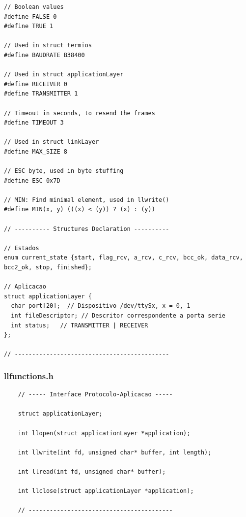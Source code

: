 \documentclass[article, a4paper, 11pt, oneside]{memoir}
\begin{document}
\begin{lstlisting}
// Boolean values
#define FALSE 0
#define TRUE 1

// Used in struct termios
#define BAUDRATE B38400

// Used in struct applicationLayer
#define RECEIVER 0
#define TRANSMITTER 1

// Timeout in seconds, to resend the frames
#define TIMEOUT 3

// Used in struct linkLayer
#define MAX_SIZE 8

// ESC byte, used in byte stuffing
#define ESC 0x7D

// MIN: Find minimal element, used in llwrite()
#define MIN(x, y) (((x) < (y)) ? (x) : (y))

// ---------- Structures Declaration ----------

// Estados
enum current_state {start, flag_rcv, a_rcv, c_rcv, bcc_ok, data_rcv, bcc2_ok, stop, finished};

// Aplicacao
struct applicationLayer {
  char port[20];  // Dispositivo /dev/ttySx, x = 0, 1
  int fileDescriptor; // Descritor correspondente a porta serie
  int status;   // TRANSMITTER | RECEIVER
};

// --------------------------------------------
\end{lstlisting}

\newpage
\subsubsection{llfunctions.h}
\begin{lstlisting}
	// ----- Interface Protocolo-Aplicacao -----

	struct applicationLayer;
	
	int llopen(struct applicationLayer *application);
	
	int llwrite(int fd, unsigned char* buffer, int length);
	
	int llread(int fd, unsigned char* buffer);
	
	int llclose(struct applicationLayer *application);
	
	// -----------------------------------------
\end{lstlisting}
\end{document}
